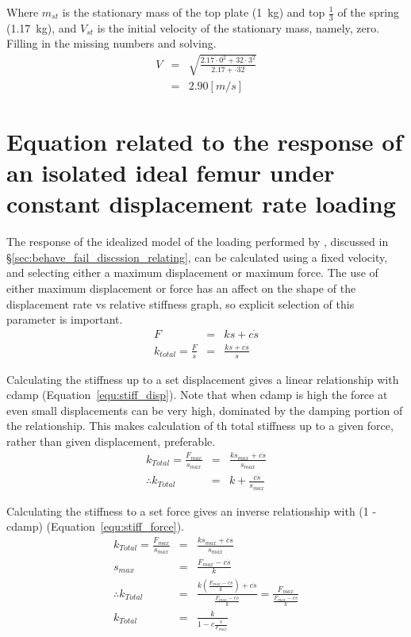 Where $m_{st}$ is the stationary mass of the top plate (1~\ac{kg}) and top $\frac{1}{3}$ of the spring (1.17~\ac{kg}), and $V_{st}$ is the initial velocity of the stationary mass, namely, zero.
Filling in the missing numbers and solving.
\vspace{-1EX}
\begin{eqnarray}
V &=& \sqrt{ \frac{2.17 \cdot 0^2 + 32 \cdot 3^2}{2.17 + \cdot 32} }\nonumber\\
  &=& 2.90\left[m/s\right]
\end{eqnarray}

\section{Equation related to the response of an isolated ideal femur under constant displacement rate loading}
\label{sec:support_courtney_response}
The response of the idealized model of the loading performed by \citet{courtney_effects_1994}, discussed in \S\ref{sec:behave_fail_discssion_relating}, can be calculated using a fixed velocity, and selecting either a maximum displacement or maximum force.
The use of either maximum displacement or force has an affect on the shape of the displacement rate \ac{vs} relative stiffness graph, so explicit selection of this parameter is important.
\vspace{-1EX}
\begin{eqnarray}
F &=& ks + c\dot{s} \nonumber\\
k_{total} = \frac{F}{s} &=& \frac{ks + c\dot{s}}{s}\nonumber
\end{eqnarray}

Calculating the stiffness up to a set displacement gives a linear relationship with \ac{cdamp} (Equation~\ref{equ:stiff_disp}).
Note that when \ac{cdamp} is high the force at even small displacements can be very high, dominated by the damping portion of the relationship.
This makes calculation of th total stiffness up to a given force, rather than given displacement, preferable.
\vspace{-1EX}
\begin{eqnarray}
k_{Total} = \frac{F_{max}}{s_{max}} &=& \frac{ks_{max} + c\dot{s}}{s_{max}} \nonumber \\
\label{equ:stiff_disp} \therefore k_{Total} &=& k + \frac{c\dot{s}}{s_{max}}
\end{eqnarray}

Calculating the stiffness to a set force gives an inverse relationship with (1 - \acs{cdamp}) (Equation~\ref{equ:stiff_force}).
\vspace{-1EX}
\begin{eqnarray}
k_{Total} = \frac{F_{max}}{s_{max}} &=& \frac{ks_{max} + c\dot{s}}{s_{max}} \nonumber \\
s_{max} &=& \frac{F_{max} - c\dot{s}}{k} \nonumber \\
\therefore k_{Total} &=& \frac{k\left( \frac{F_{max} - c\dot{s}}{k} \right) + c\dot{s}}{\frac{F_{max} - c\dot{s}}{k}} = \frac{F_{max}}{\frac{F_{max} - c\dot{s}}{k}} \nonumber \\
\label{equ:stiff_force} k_{Total} &=& \frac{k}{1 - c\frac{\dot{s}}{F_{max}}} 
\end{eqnarray}

